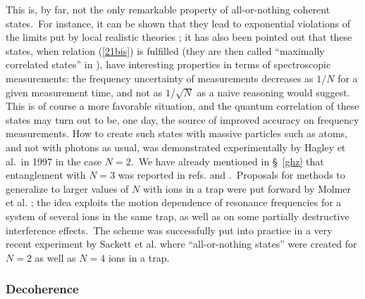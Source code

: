 \documentclass[12pt,onecolumn]{article}%
\begin{document}
This is, by far, not the only remarkable property of all-or-nothing coherent
states.\ For instance, it can be shown that they lead to exponential
violations of the limits put by local realistic theories \cite{Mermin4}; it
has also been pointed out \cite{Bollinger} that these states, when relation
(\ref{21bis}) is fulfilled (they are then called ``maximally correlated
states'' in \cite{Bollinger}), have interesting properties in terms of
spectroscopic measurements: the frequency uncertainty of measurements
decreases as $1/N$ for a given measurement time, and not as $1/\sqrt{N}$ as a
naive reasoning would suggest. This is of course a more favorable situation,
and the quantum correlation of these states may turn out to be, one day, the
source of improved accuracy on frequency measurements. How to create such
states with massive particles such as atoms, and not with photons as usual,
was demonstrated experimentally by Hagley et al.\ in 1997 \cite{Hagley} in the
case $N=2$.\ We have already mentioned in \S \ \ref{ghz} that entanglement
with $N=3$ was reported in refs. \cite{GHZ-1} and \cite{GHZ-1bis}.\ Proposals
for methods to generalize to larger values of $N$ with ions in a trap were put
forward by Molmer et al. \cite{Molmer}; the idea exploits the motion
dependence of resonance frequencies for a system of several ions in the same
trap, as well as on some partially destructive interference effects.\ The
scheme was successfully put into practice in a very recent experiment by
Sackett et al. \cite{Sackett} where ``all-or-nothing states'' were created for
$N=2$ as well as $N=4$ ions in a trap.

\subsubsection{Decoherence}

\label{decoherence}
\end{document}
